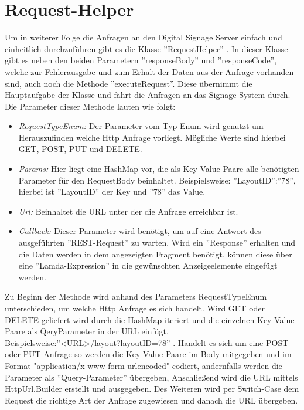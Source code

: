 \section{Request-Helper}
Um in weiterer Folge die Anfragen an den Digital Signage Server einfach und einheitlich durchzuführen gibt es die Klasse ''RequestHelper'' . In dieser Klasse gibt es neben den beiden Parametern ''responseBody'' und ''responseCode'', welche zur Fehlerausgabe und zum Erhalt der Daten aus der Anfrage vorhanden sind, auch noch die Methode ''executeRequest''. Diese übernimmt die Hauptaufgabe der Klasse und fährt die Anfragen an das Signage System durch.
\\
Die Parameter dieser Methode lauten wie folgt:
\\
\begin{itemize}
	\item {\em RequestTypeEnum:} Der Parameter vom Typ Enum wird genutzt um Herauszufinden welche Http Anfrage vorliegt. Mögliche Werte sind hierbei GET, POST, PUT und DELETE.
	
	\item {\em Params:} Hier liegt eine HashMap vor, die als Key-Value Paare alle benötigten Parameter für den RequestBody beinhaltet. Beispielsweise: ''LayoutID'':''78'', hierbei ist ''LayoutID'' der Key und ''78'' das Value.
		
	\item {\em Url:} Beinhaltet die URL unter der die Anfrage erreichbar ist. 
	
	\item {\em Callback:} Dieser Parameter wird benötigt, um auf eine Antwort des ausgeführten ''REST-Request'' zu warten. Wird ein ''Response'' erhalten und die Daten werden in dem angezeigten Fragment benötigt, können diese über eine ''Lamda-Expression'' in die gewünschten Anzeigeelemente eingefügt werden. 
\end{itemize}
Zu Beginn der Methode wird anhand des Parameters RequestTypeEnum unterschieden, um welche Http Anfrage es sich handelt. Wird GET oder DELETE geliefert wird durch die HashMap iteriert und die einzelnen Key-Value Paare als QeryParameter in der URL einfügt.
\\
Beispielsweise:''<URL>/layout?layoutID=78'' .
Handelt es sich um eine POST oder PUT Anfrage so werden die Key-Value Paare im Body mitgegeben und im Format "application/x-www-form-urlencoded" codiert, andernfalls werden die Parameter als ''Query-Parameter'' übergeben, Anschließend wird die URL mittels HttpUrl.Builder erstellt und ausgegeben. 
Des Weiteren wird per Switch-Case dem Request die richtige Art der Anfrage zugewiesen und danach die URL übergeben. 

